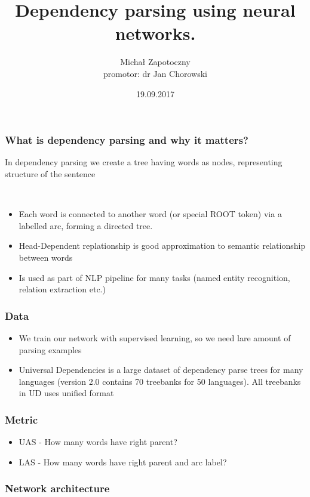 \documentclass{beamer}
\title 
{Dependency parsing using neural networks.}
\author %
{Michał Zapotoczny\\ promotor: dr Jan Chorowski}
\institute 
{
  Instytut Informatyki\\Uniwersytet Wrocławski
}
\date
{19.09.2017}
\begin{document}
\frame{\titlepage}

\begin{frame}
    \frametitle{What is dependency parsing and why it matters?}
    \begin{definition}In dependency parsing we create a tree having words as nodes,
    representing structure of the sentence\end{definition}
    \begin{center}
      \\
    \begin{itemize}
        \item Each word is connected to another word (or special ROOT token) via a labelled arc, forming a directed tree.
        \item Head-Dependent replationship is good approximation to semantic relationship between words
        \item Is used as part of NLP pipeline for many tasks (named entity recognition, relation extraction etc.)
    \end{itemize}
    \end{center}
\end{frame}

\begin{frame}
    \frametitle{Data}
    \begin{itemize}
        \item We train our network with supervised learning, so we need lare amount of
            parsing examples
        \item Universal Dependencies is a large dataset of dependency parse trees for
            many languages (version 2.0 contains 70 treebanks for 50 languages).
            All treebanks in UD uses unified format
    \end{itemize}
\end{frame}
\begin{frame}
    \frametitle{Metric}
    \begin{itemize}
        \item UAS - How many words have right parent?
        \item LAS - How many words have right parent and arc label?
    \end{itemize}
\end{frame}

\begin{frame}
    \frametitle{Network architecture}
    \begin{center}
    \end{center}
\end{frame}
\end{document}
